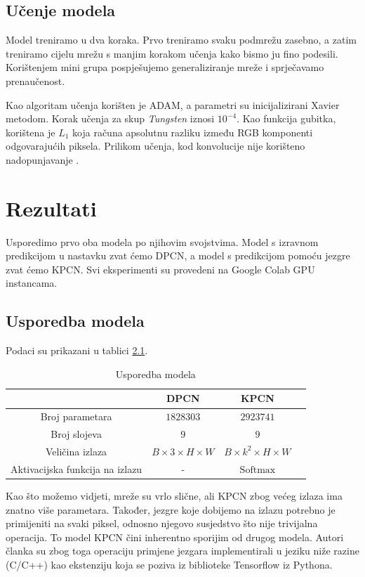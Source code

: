 \documentclass[times, utf8, seminar, numeric]{fer}
\begin{document}
\section{Učenje modela}

Model treniramo u dva koraka. Prvo treniramo svaku podmrežu zasebno, a zatim
treniramo cijelu mrežu s manjim korakom učenja kako bismo ju fino podesili. Korištenjem mini
grupa pospješujemo generaliziranje mreže i sprječavamo prenaučenost.

Kao algoritam učenja korišten je ADAM, a parametri su inicijalizirani Xavier metodom. Korak učenja
za skup \textit{Tungsten} iznosi $10^{-4}$. Kao funkcija gubitka, korištena je $L_1$ koja računa
apsolutnu razliku između RGB komponenti odgovarajućih piksela. Prilikom učenja, kod konvolucije
nije korišteno nadopunjavanje .

\chapter{Rezultati}
Usporedimo prvo oba modela po njihovim svojstvima. Model s izravnom predikcijom u nastavku zvat
ćemo DPCN, a model s predikcijom pomoću jezgre zvat ćemo KPCN. Svi eksperimenti su provedeni na
Google Colab GPU instancama.

\section{Usporedba modela}
Podaci su prikazani u tablici \ref{table:comparison}.
\begin{table}[h]
\caption{Usporedba modela}
\begin{center}
\begin{tabular}{ |c|c|c|c| }
\hline
 & DPCN & KPCN \\
\hline
Broj parametara & $1828303$ & $2923741$ \\
Broj slojeva & $9$ & $9$ \\
Veličina izlaza & $B\times3\times H\times W$ & $B\times k^2\times H\times W$ \\
Aktivacijska funkcija na izlazu & - & $\mathrm{Softmax}$\\
\hline
\end{tabular}
\end{center}
\label{table:comparison}
\end{table}

Kao što možemo vidjeti, mreže su vrlo slične, ali KPCN zbog većeg izlaza ima znatno više
parametara. Također, jezgre koje dobijemo na izlazu potrebno je primijeniti na svaki piksel,
odnosno njegovo susjedstvo što nije trivijalna operacija. To model KPCN čini inherentno
sporijim od drugog modela. Autori članka su zbog toga operaciju primjene jezgara implementirali
u jeziku niže razine (C/C++) kao ekstenziju koja se poziva iz biblioteke Tensorflow iz Pythona.
\end{document}
